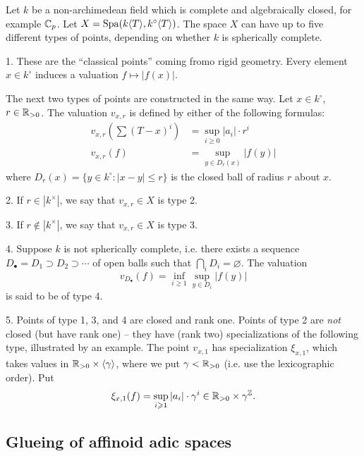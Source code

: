 \begin{example}
Let $k$ be a non-archimedean field which is complete and algebraically closed, 
for example $\mathbb{C}_p$. Let $X=\operatorname{Spa}(k\langle T\rangle, k^\circ\langle T\rangle)$. 
The space $X$ can have up to five different types of points, depending on 
whether $k$ is spherically complete. 

1. These are the ``classical points'' coming fromo rigid geometry. Every 
element $x\in k^\circ$ induces a valuation $f\mapsto |f(x)|$. 

The next two types of points are constructed in the same way. Let 
$x\in k^\circ$, $r\in \mathbb{R}_{>0}$. The valuation $v_{x,r}$ is defined by 
either of the following formulas:
\begin{align*}
  v_{x,r}\left(\sum (T-x)^i\right) &= \sup_{i\geqslant 0} |a_i|\cdot r^i \\
  v_{x,r}(f) &= \sup_{y\in D_r(x)} |f(y)|
\end{align*}
where $D_r(x) = \{y\in k^\circ:|x-y|\leqslant r\}$ is the closed ball of 
radius $r$ about $x$. 

2. If $r\in |k^\times|$, we say that $v_{x,r}\in X$ is type 2. 

3. If $r\notin |k^\times|$, we say that $v_{x,r}\in X$ is type 3. 

4. Suppose $k$ is not spherically complete, i.e. there exists a sequence 
$D_\bullet = D_1\supset D_2\supset \cdots$ of open balls such that 
$\bigcap_i D_i = \varnothing$. The valuation 
\[
  v_{D_\bullet}(f) = \inf_{i\geqslant 1} \sup_{y\in D_i} |f(y)|
\]
is said to be of type 4. 

5. Points of type 1, 3, and 4 are closed and rank one. Points of type 2 are 
\emph{not} closed (but have rank one) -- they have (rank two) specializations 
of the following type, illustrated by an example. The point $v_{x,1}$ has 
specialization $\xi_{x,1}$, which takes values in 
$\mathbb{R}_{>0}\times \langle \gamma\rangle$, where we put $\gamma<\mathbb{R}_{>0}$ (i.e. 
use the lexicographic order). Put 
\[
  \xi_{x,1}(f) = \sup_{i\geqslant 1} |a_i|\cdot \gamma^i \in \mathbb{R}_{>0}\times \gamma^{\mathbb{Z}} .
\]
\end{example}





\subsection{Glueing of affinoid adic spaces}

